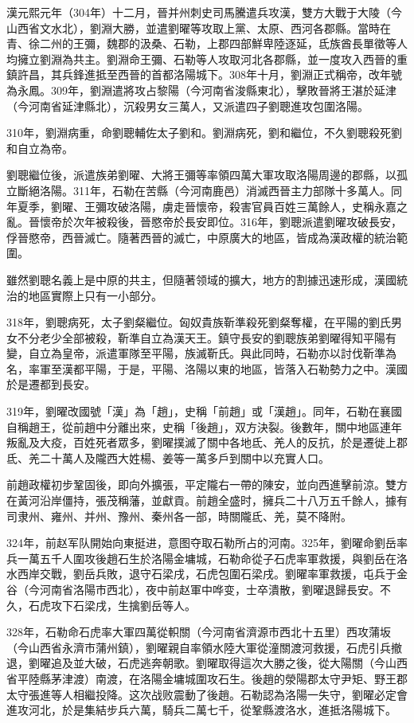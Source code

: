 漢元熙元年（304年）十二月，晉并州刺史司馬騰遣兵攻漢，雙方大戰于大陵（今山西省文水北），劉淵大勝，並遣劉曜等攻取上黨、太原、西河各郡縣。當時在青、徐二州的王彌，魏郡的汲桑、石勒，上郡四部鮮卑陸逐延，氐族酋長單徵等人均擁立劉淵為共主。劉淵命王彌、石勒等人攻取河北各郡縣，並一度攻入西晉的重鎮許昌，其兵鋒進抵至西晉的首都洛陽城下。308年十月，劉淵正式稱帝，改年號為永鳳。309年，劉淵遣將攻占黎陽（今河南省浚縣東北），擊敗晉將王湛於延津（今河南省延津縣北），沉殺男女三萬人，又派遣四子劉聰進攻包圍洛陽。

310年，劉淵病重，命劉聰輔佐太子劉和。劉淵病死，劉和繼位，不久劉聰殺死劉和自立為帝。

劉聰繼位後，派遣族弟劉曜、大將王彌等率領四萬大軍攻取洛陽周邊的郡縣，以孤立斷絕洛陽。311年，石勒在苦縣（今河南鹿邑）消滅西晉主力部隊十多萬人。同年夏季，劉曜、王彌攻破洛陽，虜走晉懷帝，殺害官員百姓三萬餘人，史稱永嘉之亂。晉懷帝於次年被殺後，晉愍帝於長安即位。316年，劉聰派遣劉曜攻破長安，俘晉愍帝，西晉滅亡。隨著西晉的滅亡，中原廣大的地區，皆成為漢政權的統治範圍。

雖然劉聰名義上是中原的共主，但隨著领域的擴大，地方的割據迅速形成，漢國統治的地區實際上只有一小部分。

318年，劉聰病死，太子劉粲繼位。匈奴貴族靳準殺死劉粲奪權，在平陽的劉氏男女不分老少全部被殺，靳準自立為漢天王。鎮守長安的劉聰族弟劉曜得知平陽有變，自立為皇帝，派遣軍隊至平陽，族滅靳氏。與此同時，石勒亦以討伐靳準為名，率軍至漢都平陽，于是，平陽、洛陽以東的地區，皆落入石勒勢力之中。漢國於是遷都到長安。

319年，劉曜改國號「漢」為「趙」，史稱「前趙」或「漢趙」。同年，石勒在襄國自稱趙王，從前趙中分離出來，史稱「後趙」，双方決裂。後數年，關中地區連年叛亂及大疫，百姓死者眾多，劉曜撲滅了關中各地氐、羌人的反抗，於是遷徙上郡氐、羌二十萬人及隴西大姓楊、姜等一萬多戶到關中以充實人口。

前趙政權初步鞏固後，即向外擴張，平定隴右一帶的陳安，並向西進擊前涼。雙方在黃河沿岸僵持，張茂稱藩，並獻貢。前趙全盛时，擁兵二十八万五千餘人，據有司隶州、雍州、并州、豫州、秦州各一部，時關隴氐、羌，莫不降附。

324年，前赵军队開始向東挺进，意图夺取石勒所占的河南。325年，劉曜命劉岳率兵一萬五千人圍攻後趙石生於洛陽金墉城，石勒命從子石虎率軍救援，與劉岳在洛水西岸交戰，劉岳兵敗，退守石梁戌，石虎包圍石梁戌。劉曜率軍救援，屯兵于金谷（今河南省洛陽市西北），夜中前赵軍中哗变，士卒潰散，劉曜退歸長安。不久，石虎攻下石梁戌，生擒劉岳等人。

328年，石勒命石虎率大軍四萬從軹關（今河南省濟源市西北十五里）西攻蒲坂（今山西省永濟市蒲州鎮），劉曜親自率領水陸大軍從潼關渡河救援，石虎引兵撤退，劉曜追及並大破，石虎逃奔朝歌。劉曜取得這次大勝之後，從大陽關（今山西省平陸縣茅津渡）南渡，在洛陽金墉城圍攻石生。後趙的滎陽郡太守尹矩、野王郡太守張進等人相繼投降。这次战败震動了後趙。石勒認為洛陽一失守，劉曜必定會進攻河北，於是集結步兵六萬，騎兵二萬七千，從鞏縣渡洛水，進抵洛陽城下。

